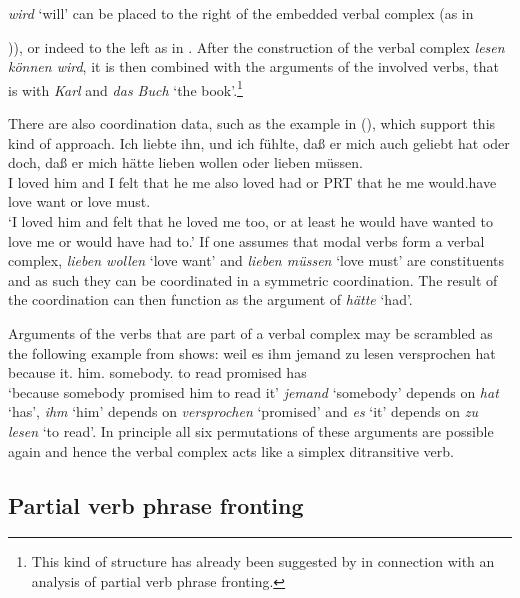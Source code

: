 \emph{wird} `will' can be placed to the right of the embedded verbal complex (as in {)), or indeed to the left as
in . After the construction of the verbal complex \emph{lesen können wird}, it is then combined with the 
arguments of the involved verbs, that is with \emph{Karl} and \emph{das Buch} `the book'.\footnote{%
		This kind of structure has already been suggested 
		by \citet*{Johnson86a} in connection with an analysis of partial verb phrase fronting.
}

There are also coordination data, such as the example in (), which support this kind of approach.
\ea
\gll Ich liebte ihn, und ich fühlte, daß er mich auch geliebt hat oder doch, daß er mich hätte lieben wollen oder lieben müssen.\footnotemark\\
     I   loved  him and I felt that he me also loved had or PRT that he me   would.have love want or love must.\\
\glt `I loved him and felt that he loved me too, or at least he would have wanted to love me or would have had to.'
\z
If one assumes that modal verbs form a verbal complex, \emph{lieben wollen} `love want' and
\emph{lieben müssen} `love must' are constituents and as such they can be coordinated in a symmetric
coordination. The result of the coordination can then function as the argument of \emph{hätte}
`had'.

Arguments of the verbs that are part of a verbal complex may be scrambled as the following example
from \citet{Haider90b} shows:
\ea\label{ex-weil-es-ihm-jemand-zu-lesen-versprochen-hat}
\gll weil es ihm jemand zu lesen versprochen hat\\
     because it.\acc{} him.\dat{} somebody.\nom{} to read promised has\\
\glt `because somebody promised him to read it'
\z
\emph{jemand} `somebody' depends on \emph{hat} `has', \emph{ihm} `him' depends on \emph{versprochen}
`promised' and \emph{es} `it' depends on \emph{zu lesen} `to read'. In principle all six
permutations of these arguments are possible again and hence the verbal complex acts like a simplex
ditransitive verb.

\subsection{Partial verb phrase fronting}
\label{sec-pvp-phen}

}
